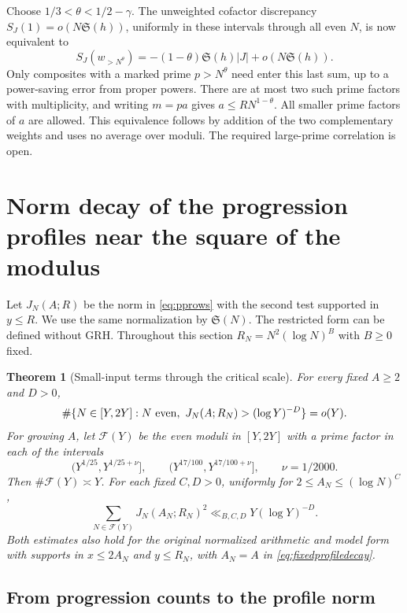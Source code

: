\documentclass[11pt,a4paper]{article}
\numberwithin{equation}{section}
\newtheorem{theorem}{Theorem}[section]
\newcommand{\SSS}{\mathfrak S}
\begin{document}
Choose $1/3<\theta<1/2-\gamma$. The unweighted cofactor
discrepancy $S_J(1)=o(N\SSS(h))$, uniformly in these intervals
through all even $N$, is now equivalent to
\[
 S_J(w_{>N^\theta})=-(1-\theta)\SSS(h)|J|+o(N\SSS(h)).
\]
Only composites with a marked prime $p>N^\theta$ need enter
this last sum, up to a power-saving error from proper powers.
There are at most two such prime factors with multiplicity,
and writing $m=pa$ gives $a\le RN^{1-\theta}$. All smaller
prime factors of $a$ are allowed. This equivalence follows by
addition of the two complementary weights and uses no average
over moduli. The required large-prime correlation is open.

\section{Norm decay of the progression profiles near the square of the modulus}
\label{sec:criticalprofiles}

Let $J_N(A;R)$ be the norm in \cref{eq:pprows} with the
second test supported in $y\le R$. We use the same
normalization by $\SSS(N)$. The restricted form can be
defined without GRH. Throughout this section $R_N=N^2(\log N)^B$
with $B\ge0$ fixed.

\begin{theorem}[Small-input terms through the critical scale]
\label{thm:criticalprofiles}
For every fixed $A\ge2$ and $D>0$,
\begin{equation}
 \#\{N\in[Y,2Y]: N\ {\rm even},\
                   J_N(A;R_N)>(\log Y)^{-D}\}=o(Y).
 \label{eq:fixedprofiledecay}
\end{equation}
For growing $A$, let $\mathcal F(Y)$ be the even moduli in
$[Y,2Y]$ with a prime factor in each of the intervals
\[
 (Y^{1/25},Y^{1/25+\nu}],\qquad
 (Y^{17/100},Y^{17/100+\nu}],\qquad \nu=1/2000.
\]
Then $\#\mathcal F(Y)\asymp Y$. For each fixed $C,D>0$,
uniformly for $2\le A_N\le(\log N)^C$,
\begin{equation}
 \sum_{N\in\mathcal F(Y)} J_N(A_N;R_N)^2
       \ll_{B,C,D}Y(\log Y)^{-D}.
 \label{eq:factoredprofiledecay}
\end{equation}
Both estimates also hold for the original normalized arithmetic
and model form with supports in $x\le2A_N$ and $y\le R_N$,
with $A_N=A$ in \cref{eq:fixedprofiledecay}.
\end{theorem}

\subsection{From progression counts to the profile norm}
\end{document}
